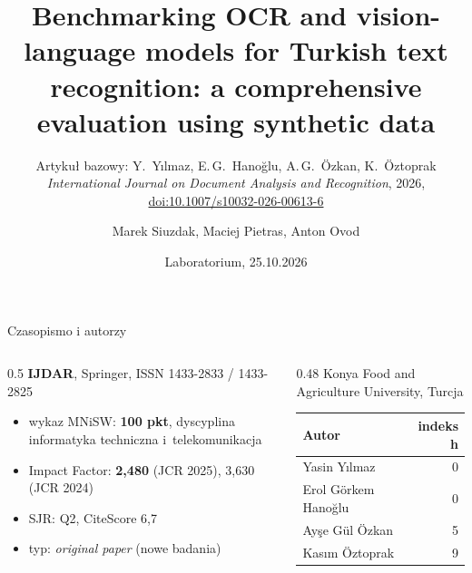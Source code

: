 \documentclass[aspectratio=169,11pt]{beamer}
\title{Benchmarking OCR and vision-language models for Turkish text
recognition: a comprehensive evaluation using synthetic data}
\subtitle{Artykuł bazowy: Y.~Yılmaz, E.\,G.~Hanoğlu, A.\,G.~Özkan, K.~Öztoprak\\
  \emph{International Journal on Document Analysis and Recognition}, 2026,
  \href{https://doi.org/10.1007/s10032-026-00613-6}{doi:10.1007/s10032-026-00613-6}}
\author{Marek Siuzdak, Maciej Pietras, Anton Ovod}
\date{Laboratorium, 25.10.2026}
\begin{document}
\begin{frame}
  \titlepage
\end{frame}

\begin{frame}{Czasopismo i autorzy}
  \begin{columns}[T]
    \begin{column}{0.5\textwidth}
      \textbf{IJDAR}, Springer, ISSN 1433-2833 / 1433-2825
      \begin{itemize}
        \item wykaz MNiSW: \textbf{100 pkt}, dyscyplina informatyka techniczna i~telekomunikacja
        \item Impact Factor: \textbf{2,480} (JCR 2025), 3,630 (JCR 2024)\footnotemark[1]
        \item SJR: Q2, CiteScore 6,7\footnotemark[2]
        \item typ: \emph{original paper} (nowe badania)
      \end{itemize}
    \end{column}
    \begin{column}{0.48\textwidth}
      \small
      Konya Food and Agriculture University, Turcja\\[4pt]
      \begin{tabular}{lr}
        \toprule
        Autor & indeks h\footnotemark[3] \\
        \midrule
        Yasin Yılmaz & 0 \\
        Erol Görkem Hanoğlu & 0 \\
        Ayşe Gül Özkan & 5 \\
        Kasım Öztoprak & 9 \\
        \bottomrule
      \end{tabular}
    \end{column}
  \end{columns}
\end{frame}
\end{document}

